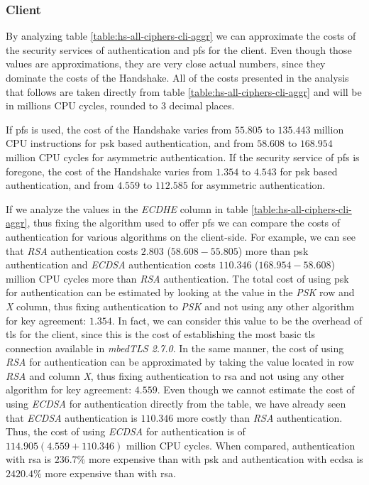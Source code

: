 \subsubsection{Client}

By analyzing table \ref{table:hs-all-ciphers-cli-aggr}  we can approximate
the costs of the security services of authentication and \gls{pfs} for the client. Even though those values are approximations,
they are very close actual numbers, since they dominate the costs of the Handshake. All of the costs presented in the 
analysis that follows are taken directly from table \ref{table:hs-all-ciphers-cli-aggr} and will be in millions CPU cycles,
rounded to $3$ decimal places.

If \gls{pfs} is used, the cost of the Handshake varies from $55.805$ to $135.443$
million CPU instructions for \gls{psk} based authentication, and from $58.608$ to $168.954$ million CPU cycles for
asymmetric authentication. If the security service of \gls{pfs} is foregone, the cost
of the Handshake varies from $1.354$ to $4.543$ for \gls{psk} based authentication,
and from $4.559$ to $112.585$ for asymmetric authentication.

If we analyze the values in the \textit{ECDHE} column in table \ref{table:hs-all-ciphers-cli-aggr}, thus fixing the
algorithm used to offer \gls{pfs} we can compare the costs of authentication for various algorithms on the client-side.
For example, we can see that \textit{RSA} authentication costs $2.803$  ($58.608 - 55.805$)
more than \gls{psk} authentication and \textit{ECDSA} authentication costs $110.346$ ($168.954 - 58.608$)
million CPU cycles more than
\textit{RSA} authentication. The total cost of using \gls{psk} for authentication can be estimated by looking at the
value in the \textit{PSK} row and \textit{X} column, thus fixing authentication to \textit{PSK} and not using any other
algorithm for key agreement: $1.354$. In fact, we can consider this value to be the overhead of \gls{tls} for the client,
since this is the cost of establishing the most basic \gls{tls} connection available in \textit{mbedTLS 2.7.0}.
In the same manner, the cost of using \textit{RSA} for authentication can
be approximated by taking the value located in row \textit{RSA} and column \textit{X}, thus fixing authentication
to \gls{rsa} and not using any other algorithm for key agreement: $4.559$. Even though we cannot estimate the cost
of using \textit{ECDSA} for authentication directly from the table, we have already seen that \textit{ECDSA} authentication
is $110.346$ more costly than \textit{RSA} authentication. Thus, the cost of using \textit{ECDSA} for authentication
is of $114.905 (4.559+110.346)$ million CPU cycles. When compared, authentication with \gls{rsa} is
$236.7\%$ more expensive than with \gls{psk} and authentication with \gls{ecdsa} is $2420.4\%$ more
expensive than with \gls{rsa}.

